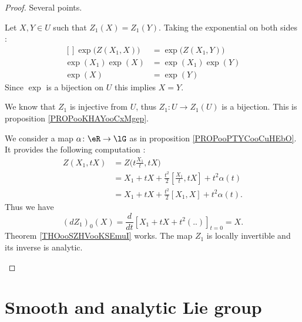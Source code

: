 \begin{proof}
	Several points.
	\begin{subproof}
		\spitem[\( Z_1\) is injective]
		Let \( X,Y\in U\) such that \( Z_1(X)=Z_1(Y)\). Taking the exponential on both sides :
		\begin{equation}
			\begin{aligned}[]
				\exp\big( Z(X_1,X) \big) & =\exp\big( Z(X_1,Y) \big) \\
				\exp(X_1)\exp(X)         & =\exp(X_1)\exp(Y)         \\
				\exp(X)                  & =\exp(Y)
			\end{aligned}
		\end{equation}
		Since \( \exp\) is a bijection on \( U\) this implies \( X=Y\).

		We know that \( Z_1\) is injective from \( U\), thus \(Z_1 \colon U\to Z_1(U)  \) is a bijection.
		\spitem[\( Z_1\) is analytic]
		This is proposition \ref{PROPooKHAYooCxMgep}.

		\spitem[Computation of \( (dZ_1)_0\)]
		We consider a map \(\alpha \colon \eR\to \lG  \) as in proposition \ref{PROPooPTYCooCuHEbO}. It provides the following computation :
		\begin{subequations}
			\begin{align}
				Z(X_1,tX) & = Z\big( t\frac{ X_1 }{ t },tX \big)                        \\
				          & =X_1+tX+\frac{ t^2 }{2}[\frac{ X_1 }{ t },tX] +t^2\alpha(t) \\
				          & =X_1+tX+\frac{ t^2 }{2}[X_1,X]+t^2\alpha(t).
			\end{align}
		\end{subequations}
		Thus we have
		\begin{equation}
			(dZ_1)_0(X)=\frac{d}{dt} \left[ X_1+tX+t^2(..)  \right]_{t=0}=X.
		\end{equation}
		Theorem \ref{THOooSZHVooKSEmuI} works. The map \( Z_1\) is locally invertible and its inverse is analytic.
	\end{subproof}
\end{proof}


\section{Smooth and analytic Lie group}

